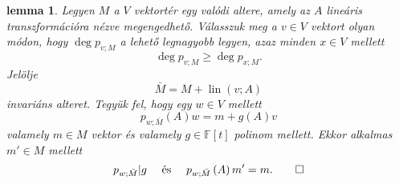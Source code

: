 \documentclass[a4paper, showtrims]{memoir}
\theoremstyle{plain}
\newtheorem{lemma}[proposition]{lemma}
\theoremstyle{remark}
\theoremstyle{definition}
\DeclareMathOperator{\lin}{lin}
\begin{document}
\begin{lemma}
    Legyen $M$ a $V$ vektortér egy valódi altere, 
    amely az $A$ lineáris transzformációra nézve megengedhető.
    Válasszuk meg a $v\in V$ vektort olyan módon, hogy $\deg p_{v;M}$ a lehető legnagyobb legyen,
    azaz minden $x\in V$ mellett
    \[
        \deg p_{v;M}
        \geq
        \deg p_{x;M}.
    \]
    Jelölje 
    \[
        \bar{M}
        =
        M+\lin\left( v;A \right)
    \]
    invariáns alteret.
    Tegyük fel, hogy egy $w\in V$ mellett 
    \[
        p_{w;\bar{M}}\left( A \right)w
        =
        m+g\left( A \right)v
        \tag{\dag}
    \]
    valamely $m\in M$ vektor és valamely $g\in\mathbb{F}\left[ t \right]$ polinom mellett.
    Ekkor alkalmas $m'\in M$ mellett
    \[
        p_{w;\bar{M}}|g 
        \quad\text{ és }\quad
        p_{w;\bar{M}}\left( A \right)m'=m.
        \qedhere
    \]
    \label{le:megengedhetolepes}
\end{lemma}
\end{document}
